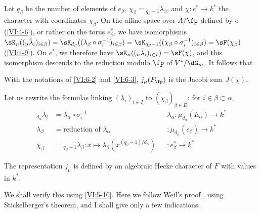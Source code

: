Let $q_\beta$ be the number of elements of $e_\beta$, 
  $\chi_\beta={}_{q_\beta-1}\lambda_\beta$, and 
$\chi:e^\ast \to k^\ast$ the character with coordinates $\chi_\beta$. On the 
affine space over $A/\fp$ defined by $e$ (\ref{VI:4-6}), or rather on the torus 
$e_\beta^\ast$, we have isomorphisms 
  $\sK_n((_n\bar\lambda_i)_{i\in\beta}) = \sK_{d_\beta}((\lambda_\beta \circ \sigma_i^{-1})_{i\in\beta}) =\sK_{q_\beta-1}((\chi_\beta\circ \sigma_i^{-1})_{i\in\beta}) = \sF(\chi_\beta)$ (\ref{VI:4-9}). 
  On $e^\ast$, we therefore have $\sK_n((_n\bar\lambda_i)_{i\in I}) = \sF(\chi)$, 
and this isomorphism descends to the reduction modulo $\fp$ of $V^\ast/\dG_m$. 
It follows that





\begin{proposition_}\label{VI:6-4}
With the notations of \ref{VI:6-2} and \ref{VI:6-3}, $j_\mu(F_\fp)$ is the 
Jacobi sum $J(\chi)$. 
\end{proposition_}

Let us rewrite the formulas linking $(\lambda_i)_{i\in I}$ to 
  $(\chi_\beta)_{\beta\in D}$: for $i\in \beta\subset \alpha$, 
\begin{align*}
  _{d_\alpha} \lambda_i &= \lambda_\alpha\circ \sigma_i^{-1} && \lambda_\alpha:\mu_{d_\alpha}(E_\alpha) \to k^\ast \\
  \lambda_\beta &= \text{reduction of $\lambda_\alpha$} && :\mu_{d_\alpha}(e_\beta) \to k^\ast \\
  \chi_\beta &= {}_{q_\beta-1}\lambda_\beta: x\mapsto \lambda_\beta(x^{(q_\beta-1)/d_\alpha}) && :e_\beta^\ast \to k^\ast 
\end{align*}





\begin{theorem_}\label{VI:6-5}
The representation $j_\mu$ is defined by an algebraic Hecke character 
of $F$ with values in $k^\ast$. 
\end{theorem_}

We shall verify this using \ref{VI:5-10}. Here we follow Weil's 
proof \cite{we52,we74-2}, using Stickelberger's theorem, 
and I shall give only a few indications. 





\subsection{}\label{VI:6-6}

